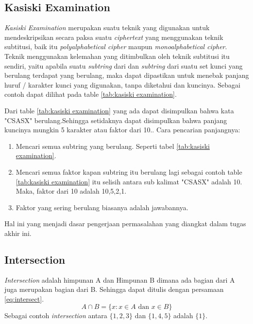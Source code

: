 	 \subsection{Kasiski Examination}
	 \textit{Kasiski Examination} merupakan suatu teknik yang digunakan untuk mendeskripsikan secara paksa suatu \textit{ciphertext} yang menggunakan teknik subtitusi, baik itu \textit{polyalphabetical cipher} maupun \textit{monoalphabetical cipher}. Teknik menggunakan kelemahan yang ditimbulkan oleh teknik subtitusi itu sendiri, yaitu apabila suatu \textit{subtring} dari \plaintext dan \textit{subtring} dari suatu set kunci yang berulang terdapat yang berulang, maka dapat dipastikan untuk menebak panjang huruf / karakter kunci yang digunakan, tanpa diketahui \plaintext dan kuncinya. Sebagai contoh dapat dilihat pada table \ref{tab:kasiski examination}.
	 \begin{table}[H]
		\caption{Contoh \textit{Kasiski Examintaion}}
		\label{tab:kasiski examination}
	\end{table}
	Dari table \ref{tab:kasiski examination} yang ada dapat disimpulkan bahwa kata "CSASX" berulang.Sehingga setidaknya dapat disimpulkan bahwa panjang kuncinya mungkin 5 karakter atau faktor dari 10.\cite{noauthor_kasiski_nodate}. Cara pencarian panjangnya:
	\begin{enumerate}
	\item Mencari semua subtring yang berulang. Seperti tabel \ref{tab:kasiski examination}.
	\item Mencari semua faktor kapan subtring itu berulang lagi sebagai contoh table \ref{tab:kasiski examination} itu selisih antara sub kalimat "CSASX" adalah 10. Maka, faktor dari 10 adalah 10,5,2,1. 
	\item Faktor yang sering berulang biasanya adalah jawabannya. 
	\end{enumerate}
	 Hal ini yang menjadi dasar pengerjaan permasalahan yang diangkat dalam tugas akhir ini.
	\subsection{Intersection}
	\textit{Intersection} adalah himpunan A dan Himpunan B dimana ada bagian dari A juga merupakan bagian dari B. Sehingga dapat ditulis dengan persamaan \ref{eq:intersect}.
	\begin{equation}
	\label{eq:intersect}
	A\cap{B=\{x:x\in A \textrm{ dan } x \in B \}}
	\end{equation}
	Sebagai contoh \textit{intersection} antara $\{1,2,3\}$ dan $\{1,4,5\}$ adalah $\{1\}$.\cite{devlin_joy_1993}	
	

